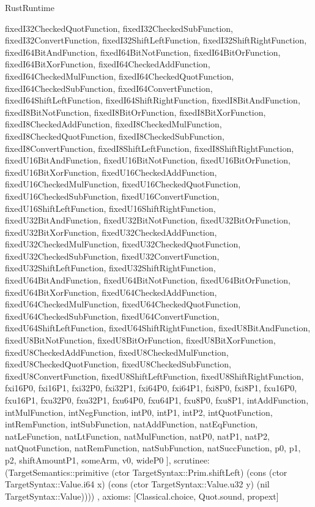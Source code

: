 \begin{lexlean}{RustRuntime}
\begin{semanticmodule}
{{      fixedI32CheckedQuotFunction,
      fixedI32CheckedSubFunction,
      fixedI32ConvertFunction,
      fixedI32ShiftLeftFunction,
      fixedI32ShiftRightFunction,
      fixedI64BitAndFunction,
      fixedI64BitNotFunction,
      fixedI64BitOrFunction,
      fixedI64BitXorFunction,
      fixedI64CheckedAddFunction,
      fixedI64CheckedMulFunction,
      fixedI64CheckedQuotFunction,
      fixedI64CheckedSubFunction,
      fixedI64ConvertFunction,
      fixedI64ShiftLeftFunction,
      fixedI64ShiftRightFunction,
      fixedI8BitAndFunction,
      fixedI8BitNotFunction,
      fixedI8BitOrFunction,
      fixedI8BitXorFunction,
      fixedI8CheckedAddFunction,
      fixedI8CheckedMulFunction,
      fixedI8CheckedQuotFunction,
      fixedI8CheckedSubFunction,
      fixedI8ConvertFunction,
      fixedI8ShiftLeftFunction,
      fixedI8ShiftRightFunction,
      fixedU16BitAndFunction,
      fixedU16BitNotFunction,
      fixedU16BitOrFunction,
      fixedU16BitXorFunction,
      fixedU16CheckedAddFunction,
      fixedU16CheckedMulFunction,
      fixedU16CheckedQuotFunction,
      fixedU16CheckedSubFunction,
      fixedU16ConvertFunction,
      fixedU16ShiftLeftFunction,
      fixedU16ShiftRightFunction,
      fixedU32BitAndFunction,
      fixedU32BitNotFunction,
      fixedU32BitOrFunction,
      fixedU32BitXorFunction,
      fixedU32CheckedAddFunction,
      fixedU32CheckedMulFunction,
      fixedU32CheckedQuotFunction,
      fixedU32CheckedSubFunction,
      fixedU32ConvertFunction,
      fixedU32ShiftLeftFunction,
      fixedU32ShiftRightFunction,
      fixedU64BitAndFunction,
      fixedU64BitNotFunction,
      fixedU64BitOrFunction,
      fixedU64BitXorFunction,
      fixedU64CheckedAddFunction,
      fixedU64CheckedMulFunction,
      fixedU64CheckedQuotFunction,
      fixedU64CheckedSubFunction,
      fixedU64ConvertFunction,
      fixedU64ShiftLeftFunction,
      fixedU64ShiftRightFunction,
      fixedU8BitAndFunction,
      fixedU8BitNotFunction,
      fixedU8BitOrFunction,
      fixedU8BitXorFunction,
      fixedU8CheckedAddFunction,
      fixedU8CheckedMulFunction,
      fixedU8CheckedQuotFunction,
      fixedU8CheckedSubFunction,
      fixedU8ConvertFunction,
      fixedU8ShiftLeftFunction,
      fixedU8ShiftRightFunction,
      fxi16P0,
      fxi16P1,
      fxi32P0,
      fxi32P1,
      fxi64P0,
      fxi64P1,
      fxi8P0,
      fxi8P1,
      fxu16P0,
      fxu16P1,
      fxu32P0,
      fxu32P1,
      fxu64P0,
      fxu64P1,
      fxu8P0,
      fxu8P1,
      intAddFunction,
      intMulFunction,
      intNegFunction,
      intP0,
      intP1,
      intP2,
      intQuotFunction,
      intRemFunction,
      intSubFunction,
      natAddFunction,
      natEqFunction,
      natLeFunction,
      natLtFunction,
      natMulFunction,
      natP0,
      natP1,
      natP2,
      natQuotFunction,
      natRemFunction,
      natSubFunction,
      natSuccFunction,
      p0,
      p1,
      p2,
      shiftAmountP1,
      someArm,
      v0,
      wideP0
    ],
    scrutinee: (TargetSemantics::primitive (ctor TargetSyntax::Prim.shiftLeft) (cons (ctor TargetSyntax::Value.i64 x) (cons (ctor TargetSyntax::Value.u32 y) (nil TargetSyntax::Value))))
  },
  axioms: [Classical.choice, Quot.sound, propext]
}


\end{semanticmodule}
\end{lexlean}
